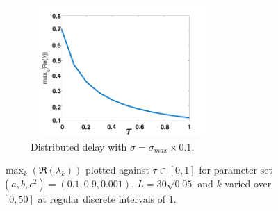\begin{figure}[H]
\begin{subfigure}[b]{0.45\textwidth}
        \includegraphics[width=7cm,height=5cm]{p2sigmax10.png}
        \caption{Distributed delay with $\sigma=\sigma_{max}\times0.1$.}
        \label{}
    \end{subfigure}
    \caption{$\max_k(\Re(\lambda_k))$ plotted against $\tau\in[0,1]$ for parameter set $(a,b,\epsilon^2)=(0.1,0.9,0.001)$. $L=30\sqrt{0.05}$ and $k$ varied over $[0,50]$ at regular discrete intervals of $1$.}
    \label{fig:p2}
\end{figure}

